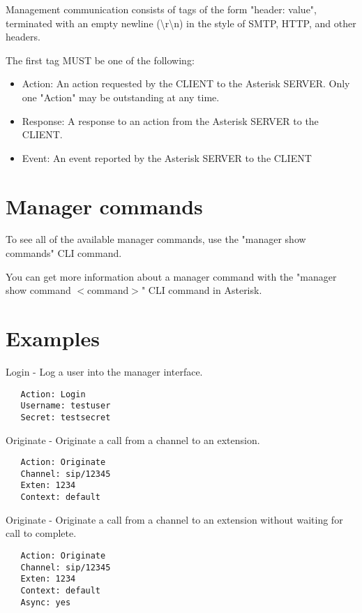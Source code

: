 Management communication consists of tags of the form "header: value", 
terminated with an empty newline (\textbackslash r\textbackslash n) in the style of SMTP, HTTP, and
other headers.

The first tag MUST be one of the following:

\begin{itemize}
    \item Action: An action requested by the CLIENT to the Asterisk SERVER. Only one "Action" may be outstanding at any time.
    \item Response: A response to an action from the Asterisk SERVER to the CLIENT.
    \item Event: An event reported by the Asterisk SERVER to the CLIENT 
\end{itemize}

\section{Manager commands}

To see all of the available manager commands, use the "manager show commands"
CLI command.

You can get more information about a manager command
with the "manager show command $<$command$>$" CLI command in Asterisk.

\section{Examples}

Login - Log a user into the manager interface.

\begin{verbatim}
   Action: Login
   Username: testuser
   Secret: testsecret
\end{verbatim}

Originate - Originate a call from a channel to an extension.

\begin{verbatim}
   Action: Originate
   Channel: sip/12345
   Exten: 1234
   Context: default
\end{verbatim}

Originate - Originate a call from a channel to an extension without waiting
for call to complete.

\begin{verbatim}
   Action: Originate
   Channel: sip/12345
   Exten: 1234
   Context: default
   Async: yes
\end{verbatim}

